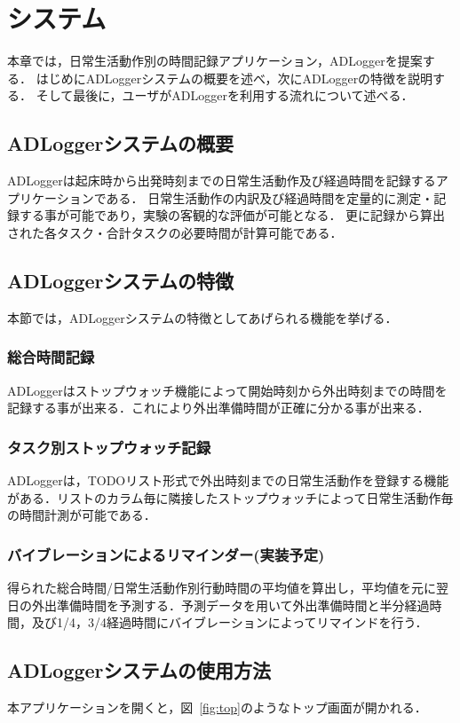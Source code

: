 \chapter{システム}
本章では，日常生活動作別の時間記録アプリケーション，ADLoggerを提案する．
はじめにADLoggerシステムの概要を述べ，次にADLoggerの特徴を説明する．
そして最後に，ユーザがADLoggerを利用する流れについて述べる．

\section{ADLoggerシステムの概要}
ADLoggerは起床時から出発時刻までの日常生活動作及び経過時間を記録するアプリケーションである．
日常生活動作の内訳及び経過時間を定量的に測定・記録する事が可能であり，実験の客観的な評価が可能となる．
更に記録から算出された各タスク・合計タスクの必要時間が計算可能である．

\section{ADLoggerシステムの特徴}
本節では，ADLoggerシステムの特徴としてあげられる機能を挙げる．

\subsection{総合時間記録}
ADLoggerはストップウォッチ機能によって開始時刻から外出時刻までの時間を記録する事が出来る．これにより外出準備時間が正確に分かる事が出来る．
\subsection{タスク別ストップウォッチ記録}
ADLoggerは，TODOリスト形式で外出時刻までの日常生活動作を登録する機能がある．リストのカラム毎に隣接したストップウォッチによって日常生活動作毎の時間計測が可能である．
\subsection{バイブレーションによるリマインダー(実装予定)}
得られた総合時間/日常生活動作別行動時間の平均値を算出し，平均値を元に翌日の外出準備時間を予測する．予測データを用いて外出準備時間と半分経過時間，及び1/4，3/4経過時間にバイブレーションによってリマインドを行う．

\section{ADLoggerシステムの使用方法}
本アプリケーションを開くと，図~\ref{fig:top}のようなトップ画面が開かれる．

